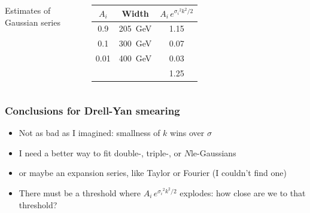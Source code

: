 \documentclass[compress]{beamer}
\begin{document}
\begin{frame}
\begin{columns}
\vspace{0.5 cm}
Estimates of Gaussian series

\vspace{0.1 cm}
\begin{tabular}{c c c}
$A_i$ & Width & $A_i \, e^{{\sigma_i}^2 k^2 / 2}$ \\\hline
0.9 & 205~GeV & 1.15 \\
0.1 & 300~GeV & 0.07 \\
0.01 & 400~GeV & 0.03 \\\hline
& & 1.25 \\
\end{tabular}

\end{columns}
\end{frame}

\begin{frame}
\frametitle{Conclusions for Drell-Yan smearing}

\begin{itemize}\setlength{\itemsep}{0.5 cm}
\item Not as bad as I imagined: smallness of $k$ wins over $\sigma$

\item I need a better way to fit double-, triple-, or $N$le-Gaussians

\item or maybe an expansion series, like Taylor or Fourier (I couldn't find one)

\item There must be a threshold where $A_i \, e^{{\sigma_i}^2 k^2 /
2}$ explodes: how close are we to that threshold?
\end{itemize}
\end{frame}
\end{document}
